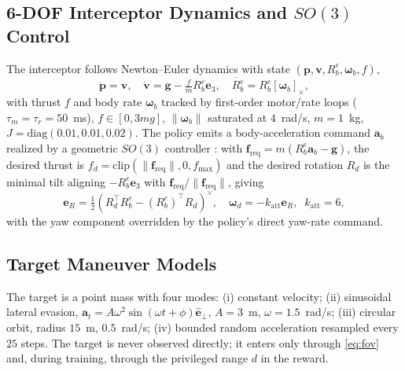 \documentclass[journal]{IEEEtran}
\newcommand{\Rbe}{R_b^e}
\begin{document}
\subsection{6-DOF Interceptor Dynamics and $SO(3)$ Control}
The interceptor follows Newton--Euler dynamics with state
$(\mathbf p,\mathbf v,\Rbe,\bm\omega_b,f)$,
\begin{equation}
\dot{\mathbf p}=\mathbf v,\quad
\dot{\mathbf v}=\mathbf g-\tfrac{f}{m}\Rbe\mathbf e_3,\quad
\dot{\Rbe}=\Rbe[\bm\omega_b]_\times,
\label{eq:newton}
\end{equation}
with thrust $f$ and body rate $\bm\omega_b$ tracked by first-order motor/rate
loops ($\tau_m=\tau_r=50$~ms), $f\in[0,3mg]$,
$\lVert\bm\omega_b\rVert$ saturated at $4$~rad/s, $m=1$~kg,
$J=\mathrm{diag}(0.01,0.01,0.02)$. The policy emits a body-acceleration
command $\mathbf a_b$ realized by a geometric $SO(3)$ controller
\cite{lee2010geometric}: with $\mathbf f_{\mathrm{req}}=m(\Rbe\mathbf a_b-\mathbf g)$,
the desired thrust is $f_d=\mathrm{clip}(\lVert\mathbf f_{\mathrm{req}}\rVert,0,f_{\max})$
and the desired rotation $R_d$ is the minimal tilt aligning $-\Rbe\mathbf e_3$
with $\mathbf f_{\mathrm{req}}/\lVert\mathbf f_{\mathrm{req}}\rVert$, giving
\begin{equation}
\mathbf e_R=\tfrac12\!\left(R_d^\top\Rbe-(\Rbe)^\top R_d\right)^{\!\vee}\!,\quad
\bm\omega_d=-k_{\mathrm{att}}\mathbf e_R,\;\;k_{\mathrm{att}}=6,
\label{eq:so3}
\end{equation}
with the yaw component overridden by the policy's direct yaw-rate command.

\subsection{Target Maneuver Models}
The target is a point mass with four modes: (i) constant velocity; (ii)
sinusoidal lateral evasion, $\mathbf a_t=A\omega^2\sin(\omega t+\phi)\hat{\mathbf e}_\perp$,
$A=3$~m, $\omega=1.5$~rad/s; (iii) circular orbit, radius $15$~m,
$0.5$~rad/s; (iv) bounded random acceleration resampled every $25$ steps.
The target is never observed directly; it enters only through
\eqref{eq:fov} and, during training, through the privileged range $d$ in the
reward.
\end{document}
